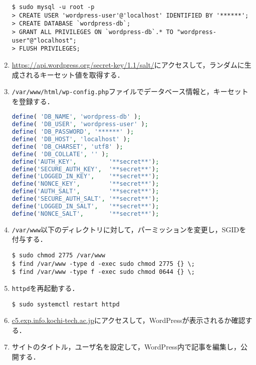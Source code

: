 \begin{enumerate}
          \begin{lstlisting}
$ sudo mysql -u root -p
> CREATE USER 'wordpress-user'@'localhost' IDENTIFIED BY '******';
> CREATE DATABASE `wordpress-db`;
> GRANT ALL PRIVILEGES ON `wordpress-db`.* TO "wordpress-user"@"localhost";
> FLUSH PRIVILEGES;
\end{lstlisting}
    \item \url{https://api.wordpress.org/secret-key/1.1/salt/}にアクセスして，ランダムに生成されるキーセット値を取得する．
    \item \texttt{/var/www/html/wp-config.php}ファイルでデータベース情報と，キーセットを登録する．
          \begin{lstlisting}[style=file,caption={\ttfamily /var/www/html/wp-config.php},language=php,escapechar={}]
define( 'DB_NAME', 'wordpress-db' );
define( 'DB_USER', 'wordpress-user' ); 
define( 'DB_PASSWORD', '******' );
define( 'DB_HOST', 'localhost' ); 
define( 'DB_CHARSET', 'utf8' );
define( 'DB_COLLATE', '' );
define('AUTH_KEY',         '**secret**');
define('SECURE_AUTH_KEY',  '**secret**');
define('LOGGED_IN_KEY',    '**secret**');
define('NONCE_KEY',        '**secret**');
define('AUTH_SALT',        '**secret**');
define('SECURE_AUTH_SALT', '**secret**');
define('LOGGED_IN_SALT',   '**secret**');
define('NONCE_SALT',       '**secret**');
\end{lstlisting}
    \item \texttt{/var/www}以下のディレクトリに対して，パーミッションを変更し，SGIDを付与する．
          \begin{lstlisting}
$ sudo chmod 2775 /var/www
$ find /var/www -type d -exec sudo chmod 2775 {} \;
$ find /var/www -type f -exec sudo chmod 0644 {} \;
    \end{lstlisting}
    \item \texttt{httpd}を再起動する．
          \begin{lstlisting}
$ sudo systemctl restart httpd
\end{lstlisting}
    \item \url{c5.exp.info.kochi-tech.ac.jp}にアクセスして，WordPressが表示されるか確認する．
    \item サイトのタイトル，ユーザ名を設定して，WordPress内で記事を編集し，公開する．
\end{enumerate}